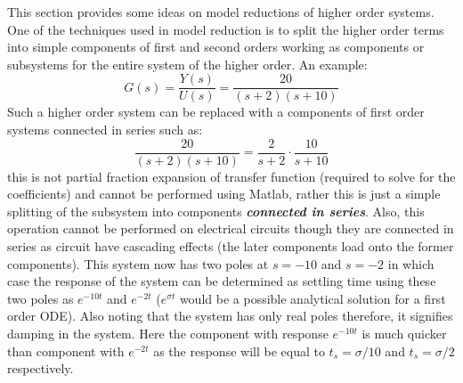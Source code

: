 This section provides some ideas on model reductions of higher order systems. One of the techniques used in model reduction is to split the higher order terms into simple components of first and second orders working as components or subsystems for the entire system of the higher order. An example:
\begin{equation}
	G(s) = \frac{Y(s)}{U(s)} = \frac{20}{(s+2)(s+10)}
\end{equation}
Such a higher order system can be replaced with a components of first order systems connected in series such as:
\begin{equation} \label{Eq_ModelReduced_Eq}
	 \frac{20}{(s+2)(s+10)} = \frac{2}{s+2} \cdot \frac{10}{s+10}
\end{equation}
this is not partial fraction expansion of transfer function (required to solve for the coefficients) and cannot be performed using Matlab, rather this is just a simple splitting of the subsystem into components \textbf{\textit{connected in series}}. Also, this operation cannot be performed on electrical circuits though they are connected in series as circuit have cascading effects (the later components load onto the former components). This system now has two poles at $s = -10$ and $s = -2$ in which case the response of the system can be determined as settling time using these two poles as $e^{-10t}$ and $e^{-2t}$ ($e^{\sigma t}$ would be a possible analytical solution for a first order ODE). Also noting that the system has only real poles therefore, it signifies damping in the system. Here the component with response $e^{-10t}$ is much quicker than component with $e^{-2t}$ as the response will be equal to $t_s = \sigma/10$ and $t_s = \sigma/2$ respectively.

